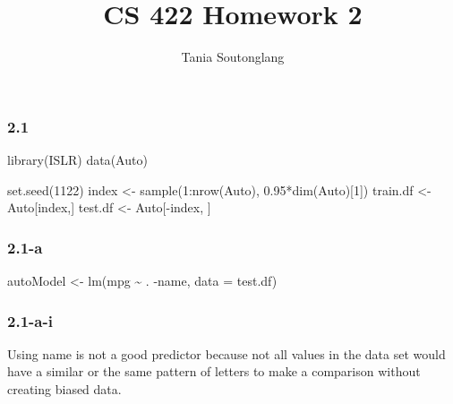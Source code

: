 \documentclass[
]{article}
\title{CS 422 Homework 2}
\author{Tania Soutonglang}
\date{}
\newenvironment{Shaded}{\begin{snugshade}}{\end{snugshade}}
\newcommand{\AttributeTok}[1]{\textcolor[rgb]{0.77,0.63,0.00}{#1}}
\newcommand{\DecValTok}[1]{\textcolor[rgb]{0.00,0.00,0.81}{#1}}
\newcommand{\FloatTok}[1]{\textcolor[rgb]{0.00,0.00,0.81}{#1}}
\newcommand{\FunctionTok}[1]{\textcolor[rgb]{0.00,0.00,0.00}{#1}}
\newcommand{\NormalTok}[1]{#1}
\newcommand{\OtherTok}[1]{\textcolor[rgb]{0.56,0.35,0.01}{#1}}
\newcommand{\SpecialCharTok}[1]{\textcolor[rgb]{0.00,0.00,0.00}{#1}}
\begin{document}
\maketitle

{
\setcounter{tocdepth}{2}
\tableofcontents
}
\hypertarget{section}{%
\subsubsection{2.1}\label{section}}

\begin{Shaded}
\begin{Highlighting}[]
\FunctionTok{library}\NormalTok{(ISLR)}
\FunctionTok{data}\NormalTok{(Auto)}

\FunctionTok{set.seed}\NormalTok{(}\DecValTok{1122}\NormalTok{)}
\NormalTok{index }\OtherTok{\textless{}{-}} \FunctionTok{sample}\NormalTok{(}\DecValTok{1}\SpecialCharTok{:}\FunctionTok{nrow}\NormalTok{(Auto), }\FloatTok{0.95}\SpecialCharTok{*}\FunctionTok{dim}\NormalTok{(Auto)[}\DecValTok{1}\NormalTok{])}
\NormalTok{train.df }\OtherTok{\textless{}{-}}\NormalTok{ Auto[index,]}
\NormalTok{test.df }\OtherTok{\textless{}{-}}\NormalTok{ Auto[}\SpecialCharTok{{-}}\NormalTok{index, ]}
\end{Highlighting}
\end{Shaded}

\hypertarget{a}{%
\subsubsection{2.1-a}\label{a}}

\begin{Shaded}
\begin{Highlighting}[]
\NormalTok{autoModel }\OtherTok{\textless{}{-}} \FunctionTok{lm}\NormalTok{(mpg }\SpecialCharTok{\textasciitilde{}}\NormalTok{ . }\SpecialCharTok{{-}}\NormalTok{name, }\AttributeTok{data =}\NormalTok{ test.df)}
\end{Highlighting}
\end{Shaded}

\hypertarget{a-i}{%
\subsubsection{2.1-a-i}\label{a-i}}

Using name is not a good predictor because not all values in the data
set would have a similar or the same pattern of letters to make a
comparison without creating biased data.
\end{document}
